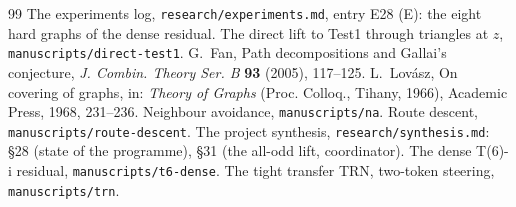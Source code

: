 \documentclass[11pt]{amsart}
\theoremstyle{definition}
\begin{document}
\begin{thebibliography}{99}
 The experiments log, \texttt{research/experiments.md}, entry E28 (E): the eight hard
graphs of the dense residual.
 The direct lift to Test1 through triangles at $z$, \texttt{manuscripts/direct-test1}.
 G.~Fan, Path decompositions and Gallai's conjecture, \emph{J. Combin. Theory Ser.
B} \textbf{93} (2005), 117--125.
 L.~Lov\'asz, On covering of graphs, in: \emph{Theory of Graphs} (Proc. Colloq.,
Tihany, 1966), Academic Press, 1968, 231--236.
 Neighbour avoidance, \texttt{manuscripts/na}.
 Route descent, \texttt{manuscripts/route-descent}.
 The project synthesis, \texttt{research/synthesis.md}: \S28 (state of the programme), \S31
(the all-odd lift, coordinator).
 The dense T(6)-i residual, \texttt{manuscripts/t6-dense}.
 The tight transfer TRN, two-token steering, \texttt{manuscripts/trn}.
\end{thebibliography}
\end{document}
